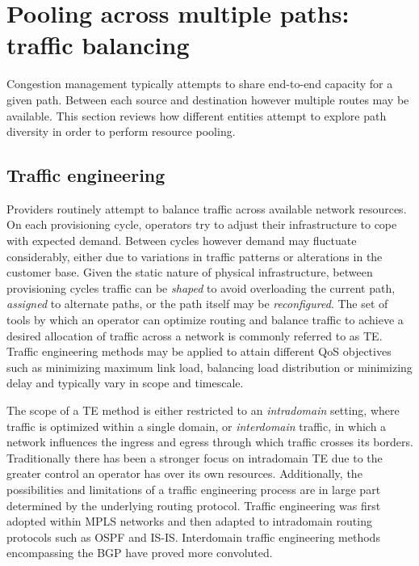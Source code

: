 \section {Pooling across multiple paths: traffic balancing}
\label{sec:resourcepooling:balancing}

Congestion management typically attempts to share end-to-end capacity for a given path.
Between each source and destination however multiple routes may be available.
This section reviews how different entities attempt to explore path diversity in order to perform resource pooling.

\subsection{Traffic engineering}

Providers routinely attempt to balance traffic across available network resources.
On each provisioning cycle, operators try to adjust their infrastructure to cope with expected demand.
Between cycles however demand may fluctuate considerably, either due to variations in traffic patterns or alterations in the customer base.
Given the static nature of physical infrastructure, between provisioning cycles traffic can be \emph{shaped} to avoid overloading the current path, \emph{assigned} to alternate paths, or the path itself may be \emph{reconfigured}.
The set of tools by which an operator can optimize routing and balance traffic to achieve a desired allocation of traffic across a network is commonly referred to as \ac{TE}.
Traffic engineering methods may be applied to attain different \ac{QoS} objectives such as minimizing maximum link load, balancing load distribution or minimizing delay and typically vary in scope and timescale.

The scope of a \ac{TE} method is either restricted to an \emph{intradomain} setting, where traffic is optimized within a single domain, or \emph{interdomain} traffic, in which a network influences the ingress and egress through which traffic crosses its borders.
Traditionally there has been a stronger focus on intradomain \ac{TE} due to the greater control an operator has over its own resources.
Additionally, the possibilities and limitations of a traffic engineering process are in large part determined by the underlying routing protocol.
Traffic engineering was first adopted within \ac{MPLS} networks and then adapted to intradomain routing protocols such as \ac{OSPF} and \ac{IS-IS}.
Interdomain traffic engineering methods encompassing the \ac{BGP} have proved more convoluted.

